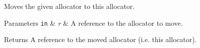 Moves the given allocator to this allocator.


\begin{DoxyParams}[1]{Parameters}
\mbox{\tt in}  & {\em r} & A reference to the allocator to move. \\
\hline
\end{DoxyParams}
\begin{DoxyReturn}{Returns}
A reference to the moved allocator (i.\+e. this allocator). 
\end{DoxyReturn}
